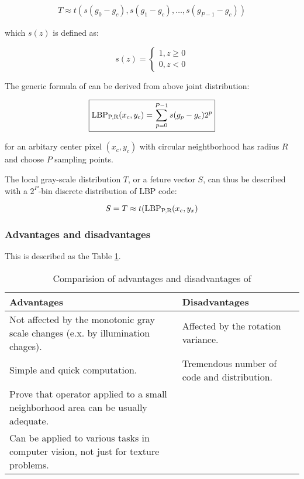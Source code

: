 \begin{align*}
	T \approx t(s(g_0 - g_c), s(g_1 - g_c), \ldots, s(g_{P-1} - g_c))
\end{align*}

which $s(z)$ is defined as:

\begin{equation*}
	s(z) =
	\begin{cases}
		1, z \geq 0 \\
		0, z < 0
	\end{cases}
\end{equation*}

The generic formula of \LBPPR can be derived from above joint distribution:

\begin{equation*}
	\boxed{ \text{LBP}_\text{P,R} (x_c, y_c) = \sum_{p = 0}^{P - 1} s(g_p - g_c)2^p}
\end{equation*}

for an arbitary center pixel $(x_c, y_c)$ with circular neightborhood has radius $R$ and choose $P$ sampling points.

The local gray-scale distribution $T$, or a feture vector $S$, can thus be described with a $2^P$-bin discrete distribution of LBP code:

\begin{equation*}
	S = T \approx t(\text{LBP}_\text{P,R} (x_c, y_x)
\end{equation*}

\subsubsection*{Advantages and disadvantages}

This is described as the Table \ref{tab:LBP1}.
	
\begin{table}[!th]
	\centering
	
	\begin{tabularx}{1.0\textwidth}{ XX }
	
	\toprule
	\textbf{Advantages} & \textbf{Disadvantages} \\
	
	\midrule

	\tabitem Not affected by the monotonic gray scale changes (e.x. by illumination chages). & \tabitem Affected by the rotation variance. \\
	\tabitem Simple and quick computation. & \tabitem Tremendous number of code and distribution. \\
	\tabitem Prove that operator applied to a small neighborhood area can be usually adequate. &\\
	\tabitem Can be applied to various tasks in computer vision, not just for texture problems. \\
	
	\bottomrule
	\end{tabularx}
	
	\caption{Comparision of advantages and disadvantages of \LBPPR}
	\label{tab:LBP1}
\end{table}

